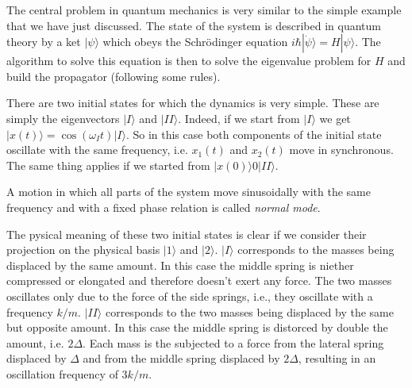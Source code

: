 \documentclass[11pt,fleqn]{book} %
\newcommand{\ket}[1]{| #1\rangle}
\begin{document}
\begin{remark}
    The central problem in quantum mechanics is very similar to the simple example
    that we have just discussed. The state of the system is described in quantum theory
    by a ket $\ket{\psi}$ which obeys the Schr\"odinger equation $i\hbar\ket{\dot\psi}=H\ket{\psi}$. The algorithm to solve this equation is
    then to solve the eigenvalue problem for $H$ and build the propagator (following some rules).
\end{remark}

There are two initial states for which the dynamics is very simple. These are simply the eigenvectors $\ket{I}$ and $\ket{II}$. Indeed, if we start from 
$\ket{I}$ we get $\ket{x(t)} = \cos(\omega_I t)\ket{I}$. So in this case both components of the initial state oscillate with the same frequency, i.e. 
$x_1(t)$ and $x_2(t)$ move in synchronous. The same thing applies if we started from $\ket{x(0)} 0 \ket{II}$.

\begin{definition}
    A motion in which all parts of the system move sinusoidally with the same frequency and with a fixed phase relation is called \textit{normal mode}.
\end{definition}

The pysical meaning of these two initial states is clear if we consider their projection on the physical basis $\ket{1}$ and $\ket{2}$. 
$\ket{I}$ corresponds to the masses being displaced by the same amount. In this case the middle spring is niether compressed or elongated and therefore doesn't
exert any force. The two masses oscillates only due to the force of the side springs, i.e., they oscillate with a frequency $k/m$. 
$\ket{II}$ corresponds to the two masses being displaced by the same but opposite amount. In this case the middle spring is distorced by double the amount, i.e. $2\Delta$.
Each mass is the subjected to a force from the lateral spring displaced by $\Delta$ and from the middle spring displaced by $2\Delta$, resulting in an oscillation 
frequency of $3k/m$.
\end{document}
